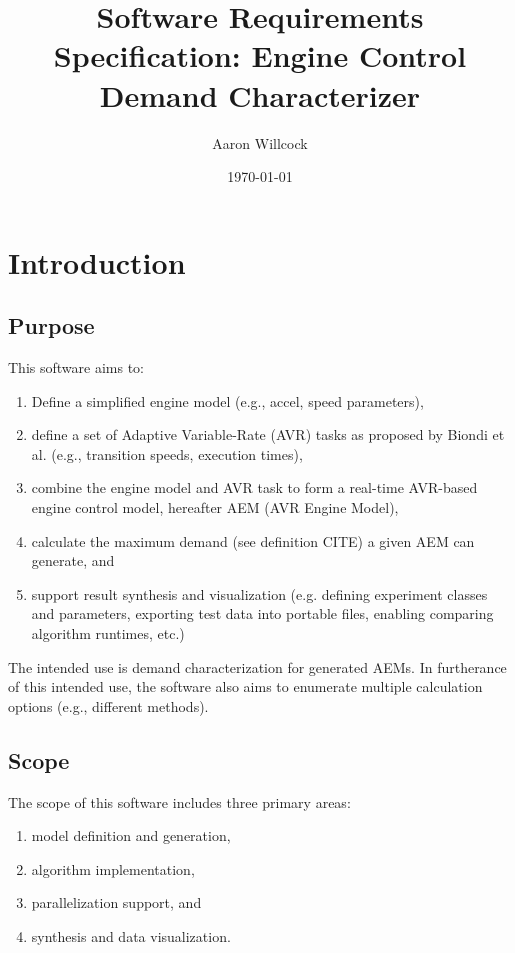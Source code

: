 \documentclass[12pt,a4paper]{article}
\title{Software Requirements Specification: Engine Control Demand Characterizer}
\date{\today}
\author{Aaron Willcock}
\begin{document}
\maketitle



\section{Introduction}
\subsection{Purpose}

This software aims to:
\begin{enumerate}
    \item Define a simplified engine model (e.g., accel, speed parameters),
    \item define a set of Adaptive Variable-Rate (AVR) tasks as proposed by
    Biondi et al. \cite{biondi} (e.g., transition speeds, execution times),
    \item combine the engine model and AVR task to form a real-time AVR-based
    engine control model, hereafter AEM (AVR Engine Model),
    \item calculate the maximum demand (see definition CITE)
    a given AEM can generate, and
    \item support result synthesis and visualization (e.g. defining experiment
    classes and parameters, exporting test data into portable files, enabling 
    comparing algorithm runtimes, etc.)
\end{enumerate}

The intended use is demand characterization for generated AEMs.
In furtherance of this intended use, the software also aims to
enumerate multiple calculation options (e.g., different methods).

\subsection{Scope}

The scope of this software includes three primary areas:
\begin{enumerate}
    \item model definition and generation,
    \item algorithm implementation,
    \item parallelization support, and
    \item synthesis and data visualization.
\end{enumerate}
\end{document}
